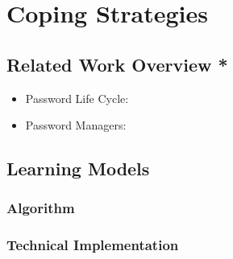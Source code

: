 \chapter[Coping Strategies]{Coping Strategies}\label{chap:psst_coping_strategies}

\section*{Related Work Overview *}
\begin{itemize}
\item Password Life Cycle: \cite{Stobert2014PasswordLifeCycle}
\item Password Managers: \cite{Chiasson2006PasswordManagers}
\end{itemize}

\section{Learning Models}

\subsection{Algorithm}

\subsection{Technical Implementation}